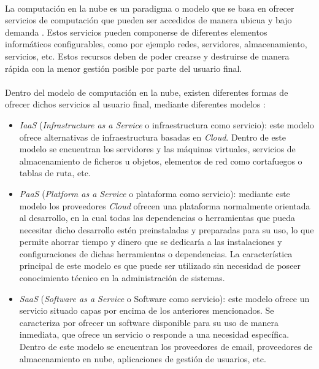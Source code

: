 \documentclass[../../memoria.tex]{subfiles}
\begin{document}
\paragraph{}
La computación en la nube es un paradigma o modelo que se basa en ofrecer servicios de computación que pueden ser accedidos de manera ubicua y bajo demanda \cite{nist}. Estos servicios pueden componerse de diferentes elementos informáticos configurables, como por ejemplo redes, servidores, almacenamiento, servicios, etc. Estos recursos deben de poder crearse y destruirse de manera rápida con la menor gestión posible por parte del usuario final.

\paragraph{}
Dentro del modelo de computación en la nube, existen diferentes formas de ofrecer dichos servicios al usuario final, mediante diferentes modelos \cite{xaas}:

\begin{itemize}
    \item \textit{IaaS} (\textit{Infrastructure as a Service} o infraestructura como servicio): este modelo ofrece alternativas de infraestructura basadas en \textit{Cloud}. Dentro de este modelo se encuentran los servidores y las máquinas virtuales, servicios de almacenamiento de ficheros u objetos, elementos de red como cortafuegos o tablas de ruta, etc.

    \item \textit{PaaS} (\textit{Platform as a Service} o plataforma como servicio): mediante este modelo los proveedores \textit{Cloud} ofrecen una plataforma normalmente orientada al desarrollo, en la cual todas las dependencias o herramientas que pueda necesitar dicho desarrollo estén preinstaladas y preparadas para su uso, lo que permite ahorrar tiempo y dinero que se dedicaría a las instalaciones y configuraciones de dichas herramientas o dependencias. La característica principal de este modelo es que puede ser utilizado sin necesidad de poseer conocimiento técnico en la administración de sistemas.

    \item \textit{SaaS} (\textit{Software as a Service} o Software como servicio): este modelo ofrece un servicio situado capas por encima de los anteriores mencionados. Se caracteriza por ofrecer un software disponible para su uso de manera inmediata, que ofrece un servicio o responde a una necesidad específica. Dentro de este modelo se encuentran los proveedores de email, proveedores de almacenamiento en nube, aplicaciones de gestión de usuarios, etc.
\end{itemize}
\end{document}
